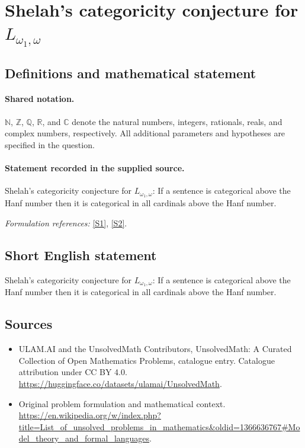 \documentclass[11pt]{article}
\newcommand{\sref}[2]{\hyperlink{source:#1:#2}{[S#2]}}
\begin{document}
\section{\texorpdfstring{Shelah's categoricity conjecture for $L_{\omega_1,\omega}$}{Shelah's categoricity conjecture for L\_omega\_1,omega}}\label{statement}

\subsection{Definitions and mathematical statement}

\paragraph{Shared notation.}$\mathbb N$, $\mathbb Z$, $\mathbb Q$, $\mathbb R$, and $\mathbb C$ denote the natural numbers, integers, rationals, reals, and complex numbers, respectively. All additional parameters and hypotheses are specified in the question.


\paragraph{Statement recorded in the supplied source.}
Shelah's categoricity conjecture for $L_{\omega_1,\omega}$: If a sentence is categorical above the Hanf number then it is categorical in all cardinals above the Hanf number.
\par\smallskip\textit{Formulation references:} \sref{statement}{1}, \sref{statement}{2}.
\subsection{Short English statement}
Shelah's categoricity conjecture for $L_{\omega_1,\omega}$: If a sentence is categorical above the Hanf number then it is categorical in all cardinals above the Hanf number.
\subsection{Sources}
\begin{itemize}
\item[\hypertarget{source:statement:1}{S1}] ULAM.AI and the UnsolvedMath Contributors, UnsolvedMath: A Curated Collection of Open Mathematics Problems, catalogue entry. Catalogue attribution under CC BY 4.0.
\url{https://huggingface.co/datasets/ulamai/UnsolvedMath}.
\item[\hypertarget{source:statement:2}{S2}] Original problem formulation and mathematical context.
\url{https://en.wikipedia.org/w/index.php?title=List_of_unsolved_problems_in_mathematics&oldid=1366636767#Model_theory_and_formal_languages}.
\end{itemize}
\label{end:statement}
\end{document}
